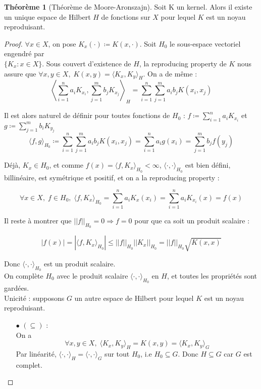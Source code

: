 \documentclass[a4paper, 11pt, french]{article}
\theoremstyle{definition}
\newtheorem{theorem}{Théorème}
\begin{document}
	\begin{theorem}[Théorème de Moore-Aronszajn]
	 	Soit K un kernel. Alors il existe un unique espace de Hilbert $H$ de fonctions sur $X$ pour lequel $K$ est un noyau reproduisant.
	\end{theorem}
	\begin{proof}
		$\forall x \in X$, on pose $K_x(\cdot) \coloneqq K(x, \cdot)$. Soit $H_0$ le sous-espace vectoriel engendré par \\ $\{K_x : x \in X\}$. Sous couvert d'existence de $H$, la reproducing property de $K$ nous assure que $\forall x, y \in X, \; K(x, y) = \langle K_x, K_y \rangle_H$. On a de même :
		\[\left\langle \sum_{i=1}^{n} a_i K_{x_i}, \sum_{j=1}^{m} b_j K_{x_j} \right\rangle_H = \sum_{i=1}^{n} \sum_{j=1}^{m} a_i b_j K(x_i, x_j)\]
		
		Il est alors naturel de définir pour toutes fonctions de $H_0$ : $f \coloneqq \sum_{i=1}^n a_i K_{x_i}$ et $g \coloneqq \sum_{j=1}^m b_i K_{y_j}$ 
		\[\langle f, g \rangle_{H_0} \coloneqq \sum_{i=1}^{n} \sum_{j=1}^{m} a_i b_j K(x_i, x_j) = \sum_{i=1}^n a_i g(x_i) = \sum_{j=1}^m b_j f(y_j)\]
		
		Déjà, $K_x \in H_0$, et comme $f(x) = \langle f, K_x \rangle_{H_0} < \infty$, $\langle \cdot, \cdot \rangle_{H_0}$ est bien défini, billinéaire, est symétrique et positif, et on a la reproducing property :
		
		\[\forall x \in X, \; f \in H_0, \; \langle f, K_x \rangle_{H_0} = \sum_{i=1}^n a_i K_x(x_i) = \sum_{i=1}^n a_i K_{x_i}(x) = f(x)\]
		
		Il reste à montrer que $||f||_{H_0} = 0 \Rightarrow f = 0$ pour que ca soit un produit scalaire :
		
		\[|f(x)| = |\langle f, K_x \rangle_{H_0}| \leq ||f||_{H_0} ||K_x||_{H_0} = ||f||_{H_0} \sqrt{K(x,x)} \]
		
		Donc $\langle \cdot, \cdot \rangle_{H_0}$ est un produit scalaire. \\
		
		On complète $H_0$ avec le produit scalaire $\langle \cdot, \cdot \rangle_{H_0}$ en $H$, et toutes les propriétés sont gardées. \\
		
		Unicité : supposons $G$ un autre espace de Hilbert pour lequel $K$ est un noyau reproduisant. 
		\begin{itemize}
			\item[$\bullet$]
			$(\subseteq)$ : \\
			On a
			\[\forall x, y \in X, \; \langle K_x, K_y \rangle_H = K(x, y) = \langle K_x, K_y \rangle_G\]
			Par linéarité, $\langle \cdot, \cdot \rangle_H = \langle \cdot, \cdot \rangle_G$ sur tout $H_0$, i.e $H_0 \subseteq G$. Donc $H \subseteq G$ car $G$ est complet.
			

\end{itemize}
\end{proof}
\end{document}
